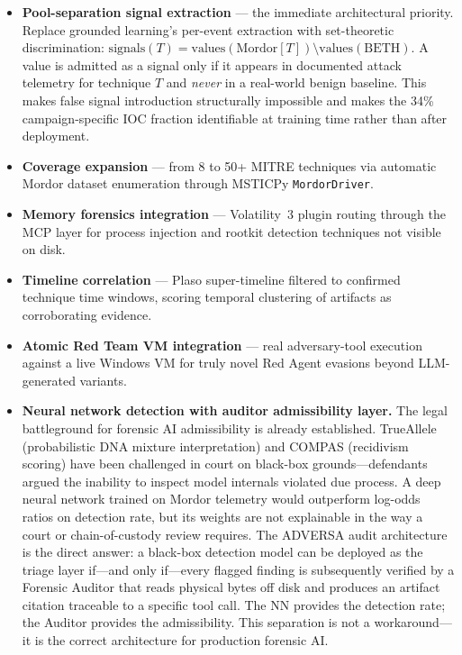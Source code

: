 \documentclass[sigconf, nonacm]{acmart}
\begin{document}
\begin{itemize}
  \item \textbf{Pool-separation signal extraction} — the immediate
        architectural priority. Replace grounded learning's per-event
        extraction with set-theoretic discrimination:
        $\text{signals}(T) = \text{values}(\text{Mordor}[T]) \setminus
        \text{values}(\text{BETH})$.
        A value is admitted as a signal only if it appears in documented
        attack telemetry for technique $T$ and \emph{never} in a
        real-world benign baseline. This makes false signal introduction
        structurally impossible and makes the 34\% campaign-specific IOC
        fraction identifiable at training time rather than after
        deployment.
  \item \textbf{Coverage expansion} — from 8 to 50+ MITRE techniques
        via automatic Mordor dataset enumeration through MSTICPy
        \texttt{MordorDriver}.
  \item \textbf{Memory forensics integration} — Volatility~3 plugin
        routing through the MCP layer for process injection and rootkit
        detection techniques not visible on disk.
  \item \textbf{Timeline correlation} — Plaso super-timeline filtered to
        confirmed technique time windows, scoring temporal clustering of
        artifacts as corroborating evidence.
  \item \textbf{Atomic Red Team VM integration} — real adversary-tool
        execution against a live Windows VM for truly novel Red Agent
        evasions beyond LLM-generated variants.
  \item \textbf{Neural network detection with auditor admissibility layer.}
        The legal battleground for forensic AI admissibility is already
        established. TrueAllele (probabilistic DNA mixture interpretation)
        and COMPAS (recidivism scoring) have been challenged in court on
        black-box grounds---defendants argued the inability to inspect
        model internals violated due process. A deep neural network
        trained on Mordor telemetry would outperform log-odds ratios on
        detection rate, but its weights are not explainable in the way
        a court or chain-of-custody review requires. The ADVERSA audit
        architecture is the direct answer: a black-box detection model
        can be deployed as the triage layer if---and only if---every
        flagged finding is subsequently verified by a Forensic Auditor
        that reads physical bytes off disk and produces an artifact
        citation traceable to a specific tool call. The NN provides the
        detection rate; the Auditor provides the admissibility. This
        separation is not a workaround---it is the correct architecture
        for production forensic AI.
\end{itemize}
\end{document}
